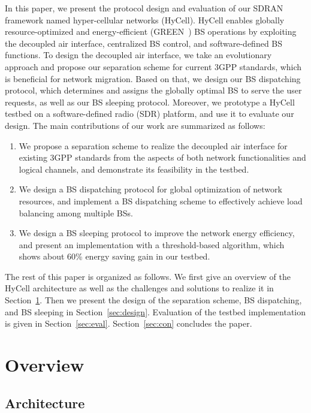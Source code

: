 \documentclass[conference]{IEEEtran}
\begin{document}
In this paper, we present the protocol design and evaluation of
our SDRAN framework named hyper-cellular networks (HyCell). HyCell enables
globally resource-optimized and energy-efficient (GREEN~\cite{niu2011tango}) BS operations
by exploiting the decoupled air
interface, centralized BS control, and software-defined BS functions.
To design the decoupled air interface,
we take an evolutionary approach
and propose our separation scheme for current 3GPP standards, which
is beneficial for network migration.
Based on that, we design our BS dispatching protocol,
which determines and assigns the globally optimal BS to serve the user
requests, as well as our BS sleeping protocol.
Moreover, we prototype a HyCell testbed on a software-defined radio (SDR)
platform, and use it to evaluate our design.
The main contributions of our work are summarized as follows:
\begin{enumerate}
  \item We propose a separation scheme to realize the decoupled air interface
    for existing 3GPP
    standards from the aspects of
    both network functionalities and logical channels, and demonstrate its
    feasibility in the testbed.
  \item We design a BS dispatching protocol for global optimization of
    network resources, and
    implement a BS dispatching scheme to effectively achieve
    load balancing among multiple BSs.
  \item We design a BS sleeping protocol to
    improve the network energy efficiency,
    and present an implementation with a threshold-based algorithm, which
    shows about 60\% energy saving gain in our testbed.
\end{enumerate}

The rest of this paper is organized as follows.
We first give an overview of the HyCell architecture as well as
the challenges and solutions to realize it in Section~\ref{sec:overview}.
Then we present the design of the separation scheme, BS
dispatching, and BS sleeping in Section~\ref{sec:design}.
Evaluation of the testbed implementation is given in Section~\ref{sec:eval}.
Section~\ref{sec:con} concludes the paper.

\section{Overview}
\label{sec:overview}
\subsection{Architecture}
\label{sec:arch}
\end{document}
